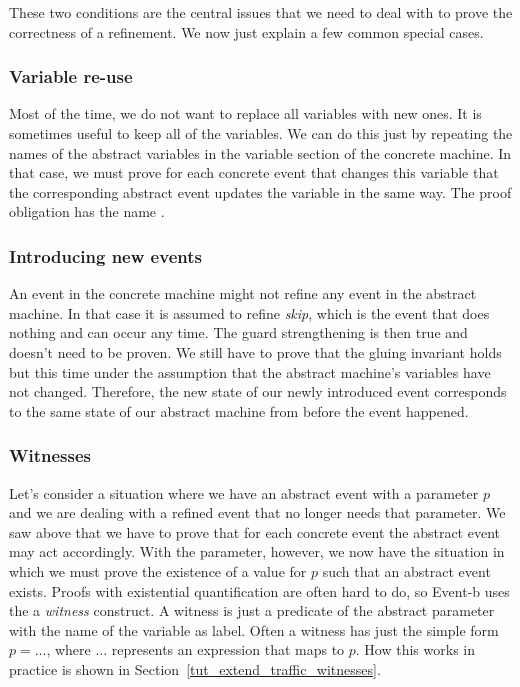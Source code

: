 These two conditions are the central issues that we need to deal with to prove the correctness of a refinement. We now just explain a few
common special cases.

\subsubsection{Variable re-use}
\label{tut_variable_reuse}
Most of the time, we do not want to replace all variables with new ones. It is sometimes useful to keep all of the variables.
We can do this just by repeating the names of the abstract variables in the variable section of the concrete
machine. In that case, we must prove for each concrete event that changes this variable that the corresponding 
abstract event updates the variable in the same way.
The proof obligation has the name .

\subsubsection{Introducing new events}
\label{tut_skip}
An event in the concrete machine might not refine any event in the abstract machine. In that case it is assumed
to refine \emph{skip}, which is the event that does nothing and can occur any time. 
The guard strengthening is then true and doesn't need to be proven.
We still have to prove that the gluing invariant holds but this time under the assumption that the abstract machine's
variables have not changed. Therefore, the new state of our newly introduced event corresponds to the same state of
our abstract machine from before the event happened.

\subsubsection{Witnesses}
\label{tut_witnesses}
Let's consider a situation where we have an abstract event with a parameter $p$ and we are dealing with a refined event that no longer needs that parameter.
We saw above that we have to prove that for each concrete event the abstract event may act accordingly.
With the parameter, however, we now have the situation in which we must prove the existence of a value for $p$ such
that an abstract event exists. Proofs with existential quantification are often hard to do, so Event-b 
uses the a \emph{witness} construct. A witness is just a predicate of the abstract parameter with the
name of the variable as label. Often a witness has just the simple form $p = \ldots$, where $\ldots$ represents an expression that maps to $p$.  How this works in practice is shown in Section~\ref{tut_extend_traffic_witnesses}.


